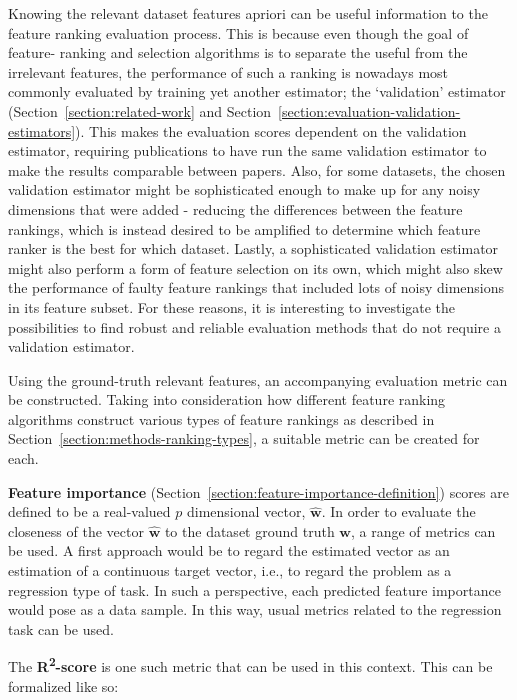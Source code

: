\documentclass[../main.tex]{subfiles}
\begin{document}
Knowing the relevant dataset features apriori can be useful information to the feature ranking evaluation process. This is because even though the goal of feature- ranking and selection algorithms is to separate the useful from the irrelevant features, the performance of such a ranking is nowadays most commonly evaluated by training yet another estimator; the `validation' estimator (Section~\ref{section:related-work} and Section~\ref{section:evaluation-validation-estimators}). This makes the evaluation scores dependent on the validation estimator, requiring publications to have run the same validation estimator to make the results comparable between papers. Also, for some datasets, the chosen validation estimator might be sophisticated enough to make up for any noisy dimensions that were added - reducing the differences between the feature rankings, which is instead desired to be amplified to determine which feature ranker is the best for which dataset. Lastly, a sophisticated validation estimator might also perform a form of feature selection on its own, which might also skew the performance of faulty feature rankings that included lots of noisy dimensions in its feature subset. For these reasons, it is interesting to investigate the possibilities to find robust and reliable evaluation methods that do not require a validation estimator.

Using the ground-truth relevant features, an accompanying evaluation metric can be constructed. Taking into consideration how different feature ranking algorithms construct various types of feature rankings as described in Section~\ref{section:methods-ranking-types}, a suitable metric can be created for each.

\textbf{Feature importance} (Section~\ref{section:feature-importance-definition}) scores are defined to be a real-valued $p$ dimensional vector, $\hat{\boldsymbol{w}}$. In order to evaluate the closeness of the vector $\hat{\boldsymbol{w}}$ to the dataset ground truth $\boldsymbol{w}$, a range of metrics can be used. A first approach would be to regard the estimated vector as an estimation of a continuous target vector, i.e., to regard the problem as a regression type of task. In such a perspective, each predicted feature importance would pose as a data sample. In this way, usual metrics related to the regression task can be used.

The \textbf{R\textsuperscript{2}-score} is one such metric that can be used in this context. This can be formalized like so:
\end{document}
